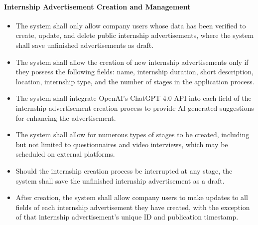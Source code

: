 \paragraph{Internship Advertisement Creation and Management}
\begin{itemize}[label={[\textbf{FR}]}, align=left, leftmargin=*]
    \item {} The system shall only allow company users whose data has been verified to create, update, and delete public internship advertisements, where the system shall save unfinished advertisements as draft.
    \item {} The system shall allow the creation of new internship advertisements only if they possess the following fields: name, internship duration, short description, location, internship type, and the number of stages in the application process.
    \item {} The system shall integrate OpenAI's ChatGPT 4.0 API into each field of the internship advertisement creation process to provide AI-generated suggestions for enhancing the advertisement.
    \item {} The system shall allow for numerous types of stages to be created, including but not limited to questionnaires and video interviews, which may be scheduled on external platforms.
   
    \item {} Should the internship creation process be interrupted at any stage, the system shall save the unfinished internship advertisement as a draft.
    \item {} After creation, the system shall allow company users to make updates to all fields of each internship advertisement they have created, with the exception of that internship advertisement's unique ID and publication timestamp.
\end{itemize}

